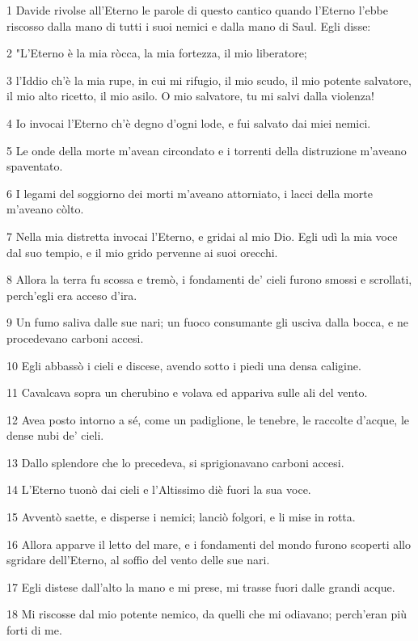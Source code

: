 \par 1 Davide rivolse all'Eterno le parole di questo cantico quando l'Eterno l'ebbe riscosso dalla mano di tutti i suoi nemici e dalla mano di Saul. Egli disse:
\par 2 "L'Eterno è la mia ròcca, la mia fortezza, il mio liberatore;
\par 3 l'Iddio ch'è la mia rupe, in cui mi rifugio, il mio scudo, il mio potente salvatore, il mio alto ricetto, il mio asilo. O mio salvatore, tu mi salvi dalla violenza!
\par 4 Io invocai l'Eterno ch'è degno d'ogni lode, e fui salvato dai miei nemici.
\par 5 Le onde della morte m'avean circondato e i torrenti della distruzione m'aveano spaventato.
\par 6 I legami del soggiorno dei morti m'aveano attorniato, i lacci della morte m'aveano còlto.
\par 7 Nella mia distretta invocai l'Eterno, e gridai al mio Dio. Egli udì la mia voce dal suo tempio, e il mio grido pervenne ai suoi orecchi.
\par 8 Allora la terra fu scossa e tremò, i fondamenti de' cieli furono smossi e scrollati, perch'egli era acceso d'ira.
\par 9 Un fumo saliva dalle sue nari; un fuoco consumante gli usciva dalla bocca, e ne procedevano carboni accesi.
\par 10 Egli abbassò i cieli e discese, avendo sotto i piedi una densa caligine.
\par 11 Cavalcava sopra un cherubino e volava ed appariva sulle ali del vento.
\par 12 Avea posto intorno a sé, come un padiglione, le tenebre, le raccolte d'acque, le dense nubi de' cieli.
\par 13 Dallo splendore che lo precedeva, si sprigionavano carboni accesi.
\par 14 L'Eterno tuonò dai cieli e l'Altissimo diè fuori la sua voce.
\par 15 Avventò saette, e disperse i nemici; lanciò folgori, e li mise in rotta.
\par 16 Allora apparve il letto del mare, e i fondamenti del mondo furono scoperti allo sgridare dell'Eterno, al soffio del vento delle sue nari.
\par 17 Egli distese dall'alto la mano e mi prese, mi trasse fuori dalle grandi acque.
\par 18 Mi riscosse dal mio potente nemico, da quelli che mi odiavano; perch'eran più forti di me.
